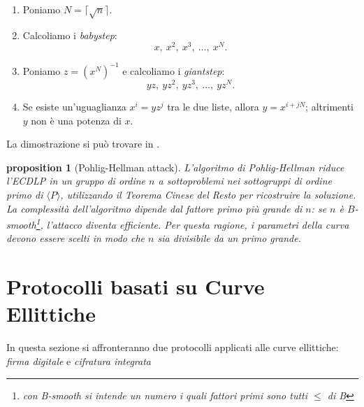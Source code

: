 \documentclass[12pt, a4paper]{report}
\newtheorem{proposition}{proposition}[section]
\begin{document}
\begin{enumerate}
    \item Poniamo $N = \lceil \sqrt{n} \rceil$.
    \item Calcoliamo i \textit{babystep}:
    \begin{equation}
        x,\ x^2,\ x^3,\ \dots,\ x^N.
    \end{equation}
    \item Poniamo $z = (x^N)^{-1}$ e calcoliamo i \textit{giantstep}:
    \begin{equation}
        yz,\ yz^2,\ yz^3,\ \dots,\ yz^N.
    \end{equation}
    \item Se esiste un'uguaglianza $x^i = yz^j$ tra le due liste, 
    allora $y = x^{i + jN}$; altrimenti $y$ non è una potenza di $x$.
\end{enumerate}
La dimostrazione si può trovare in \cite{silverman}.
\begin{proposition}[Pohlig-Hellman attack]
    L'algoritmo di Pohlig-Hellman \cite{Hankerson} riduce l'ECDLP 
in un gruppo di ordine $n$ a sottoproblemi nei sottogruppi di ordine 
primo di $\langle P \rangle$, utilizzando il Teorema Cinese del Resto 
per ricostruire la soluzione. La complessità dell'algoritmo dipende 
dal fattore primo più grande di $n$: se $n$ è $B$-smooth\footnote{con B-smooth si intende un numero 
i quali fattori primi sono tutti $\leq$ di B}, l'attacco diventa efficiente. 
Per questa ragione, i parametri della curva devono essere scelti in modo che 
$n$ sia divisibile da un primo grande.
\end{proposition}

\chapter{Protocolli basati su Curve Ellittiche}
In questa sezione si affronteranno due protocolli applicati alle curve ellittiche: \textit{firma digitale} e \textit{cifratura integrata}
\end{document}
